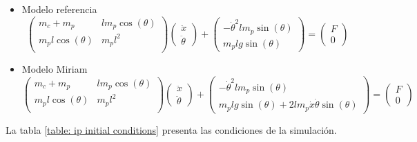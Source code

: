 \documentclass[12pt,letterpaper]{article}
\begin{document}
\begin{itemize}
 \item Modelo referencia
\begin{equation*}
  \begin{pmatrix}
  m_c + m_p & l m_p \cos (\theta) \\
  m_p l \cos (\theta) & m_p l^2\\
 \end{pmatrix}
 \begin{pmatrix}
  \ddot{x} \\
  \ddot{\theta}
 \end{pmatrix}
 +
 \begin{pmatrix}
  -\dot{\theta}^2 l m_p \sin(\theta) \\
  m_p l g \sin(\theta)
 \end{pmatrix}
 = 
 \begin{pmatrix}
  F \\
  0
 \end{pmatrix}
\end{equation*}


 \item Modelo Miriam
\begin{equation*}
  \begin{pmatrix}
  m_c + m_p & l m_p \cos (\theta) \\
  m_p l \cos (\theta) & m_p l^2\\
 \end{pmatrix}
 \begin{pmatrix}
  \ddot{x} \\
  \ddot{\theta}
 \end{pmatrix}
 +
 \begin{pmatrix}
  -\dot{\theta}^2 l m_p \sin(\theta) \\
  m_p l g \sin(\theta) + 2 l m_p \dot{x} \dot{\theta} \sin(\theta)
 \end{pmatrix}
 = 
 \begin{pmatrix}
  F \\
  0
 \end{pmatrix}
\end{equation*}
\end{itemize}

La tabla \ref{table: ip initial conditions} presenta las condiciones de la simulación.
\end{document}
